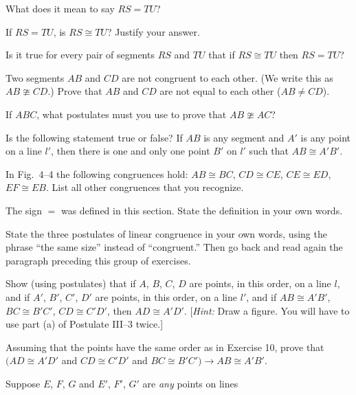 \documentclass[11pt]{book}
\begin{document}
\begin{exercisecols}
\begin{exlist}
\item What does it mean to say $RS = TU$?
\item If $RS = TU$, is $RS \cong TU$? Justify your answer.
\item Is it true for every pair of segments $RS$ and $TU$ that if
      $RS \cong TU$ then $RS = TU$?
\item Two segments $AB$ and $CD$ are not congruent to each other. (We write this
      as $AB \ncong CD$.) Prove that $AB$ and $CD$ are not equal to each other
      ($AB \neq CD$).
\item If $ABC$, what postulates must you use to prove that $AB \ncong AC$?
\item Is the following statement true or false? If $AB$ is any segment and $A'$
      is any point on a line $l'$, then there is one and only one point $B'$ on
      $l'$ such that $AB \cong A'B'$.
\item In Fig.~4--4 the following congruences hold: $AB \cong BC$,
      $CD \cong CE$, $CE \cong ED$, $EF \cong EB$. List all other congruences
      that you recognize.
\exfig{\FIGIVFOUR}
\item The sign $=$ was defined in this section. State the definition in your own
      words.
\item State the three postulates of linear congruence in your own words, using
      the phrase ``the same size'' instead of ``congruent.'' Then go back and
      read again the paragraph preceding this group of exercises.
\item Show (using postulates) that if $A$, $B$, $C$, $D$ are points, in this
      order, on a line $l$, and if $A'$, $B'$, $C'$, $D'$ are points, in this
      order, on a line $l'$, and if $AB \cong A'B'$, $BC \cong B'C'$,
      $CD \cong C'D'$, then $AD \cong A'D'$. [\emph{Hint:} Draw a figure. You
      will have to use part (a) of Postulate III--3 twice.]
\item Assuming that the points have the same order as in Exercise 10, prove that
      $(AD \cong A'D'$ and $CD \cong C'D'$ and
      $BC \cong B'C') \rightarrow AB \cong A'B'$.
\item Suppose $E$, $F$, $G$ and $E'$, $F'$, $G'$ are \emph{any} points on lines

\end{exlist}
\end{exercisecols}
\end{document}
